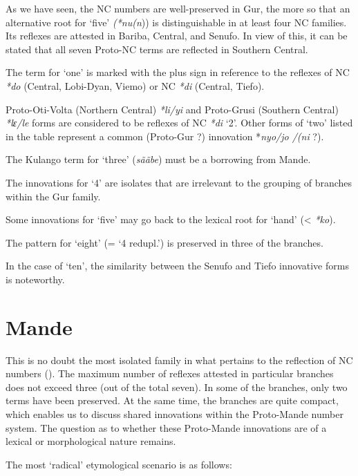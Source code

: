 As we have seen, the NC numbers are well-preserved in Gur, the more so that an alternative root for ‘five’ \textit{(*nu}\textit{(n})) is distinguishable in at least four NC families. Its reflexes are attested in Bariba, Central, and Senufo. In view of this, it can be stated that all seven Proto-NC terms are reflected in Southern Central. 

The term for ‘one’ is marked with the plus sign in reference to the reflexes of NC \textit{*do} (Central, Lobi-Dyan, Viemo) or NC \textit{*di} (Central, Tiefo).

Proto-Oti-Volta (Northern Central) \textit{*li/yi} and Proto-Grusi (Southern Central) \textit{*lɛ/le} forms are considered to be reflexes of NC \textit{*di} ‘2’. Other forms of ‘two’ listed in the table represent a common (Proto-Gur ?) innovation  *\textit{nyo/jo /(ni} ?).

\largerpage[2]
The Kulango term for ‘three’ (\textit{s{\~{a}}{\~{a}}be}) must be a borrowing from Mande.

The innovations for ‘4’ are isolates that are irrelevant to the grouping of bran\-ches within the Gur family. 

Some innovations for ‘five’ may go back to the lexical root for ‘hand’ (< \textit{*ko}).

The pattern for ‘eight’ (= ‘4 redupl.’) is preserved in three of the branches.

In the case of ‘ten’, the similarity between the Senufo and Tiefo innovative forms is noteworthy.




\section{Mande}%

This is no doubt the most isolated family in what pertains to the reflection of NC numbers (). The maximum number of reflexes attested in particular branches does not exceed three (out of the total seven). In some of the branches, only two terms have been preserved. At the same time, the branches are quite compact, which enables us to discuss shared innovations within the Proto-Mande number system. The question as to whether these Proto-Mande innovations are of a lexical or morphological nature remains.

The most ‘radical’ etymological scenario is as follows:

